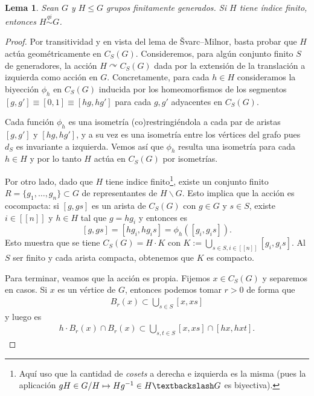 \documentclass[11pt]{article}
\theoremstyle{colored}
\newtheorem{lemma}{Lema}
\newcommand{\nat}[1]{[\![#1]\!]}
\newcommand{\qi}{\stackrel{qi}{\sim}}
\begin{document}
\begin{lemma} Sean $G$ y $H \leq G$ grupos finitamente generados. Si $H$ tiene índice finito, entonces $H \qi G$.
\end{lemma}
\begin{proof} Por transitividad y en vista del lema de Švarc–Milnor, basta probar que $H$ actúa geométricamente en $C_S(G)$. Consideremos, para algún conjunto finito $S$ de generadores, la acción $H \curvearrowright C_S(G)$ dada por la extensión de la translación a izquierda como acción en $G$. Concretamente, para cada $h \in H$ consideramos la biyección $\phi_h$ en $C_S(G)$ inducida por los homeomorfismos de los segmentos $[g,g'] \equiv [0,1] \equiv [hg,hg']$ para cada $g,g'$ adyacentes en $C_S(G)$. 

Cada función $\phi_h$ es una isometría (co)restringiéndola a cada par de aristas $[g,g']$ y $[hg,hg']$, y a su vez es una isometría entre los vértices del grafo pues $d_S$ es invariante a izquierda. Vemos así que $\phi_h$ resulta una isometría para cada $h \in H$ y por lo tanto $H$ actúa en $C_S(G)$ por isometrías.

Por otro lado, dado que $H$ tiene indice finito\footnote{Aquí uso que la cantidad de \textit{cosets} a derecha e izquierda es la misma (pues la aplicación $gH \in G/H \mapsto Hg^{-1} \in H\textbackslash G$ es biyectiva).}, existe un conjunto finito $R = \{g_1, \dots, g_n\} \subset G$ de representantes de $H \backslash G$. Esto implica que la acción es cocompacta: si $[g,gs]$ es un arista de $C_S(G)$ con $g \in G$ y $s \in S$, existe $i \in \nat{n}$ y $h \in H$ tal que $g = hg_i$ y entonces es
\[
[g,gs] = [hg_i,hg_is] = \phi_h([g_i,g_is]).
\]
Esto muestra que se tiene $C_S(G) = H \cdot K$ con $K := \bigcup_{s \in S, i\in\nat{n}}[g_i,g_is]$. Al $S$ ser finito y cada arista compacta, obtenemos que $K$ es compacto.

Para terminar, veamos que la acción es propia. Fijemos $x \in C_S(G)$ y separemos en casos. Si $x$ es un vértice de $G$, entonces podemos tomar $r > 0$ de forma que
\begin{align*}
B_r(x) \subset \bigcup_{s \in S}[x,xs]
\end{align*}
y luego es
\begin{align*}
h \cdot B_r(x) \cap B_r(x) \subset \bigcup_{s,t \in S} [x,xs] \cap [hx,hxt].
\end{align*}


\end{proof}
\end{document}
